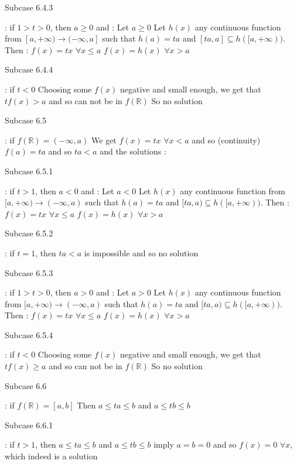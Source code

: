 \begin{solution}
\begin{bolded}Subcase 6.4.3\end{bolded} : if $1>t>0$, then $a\ge 0$ and :
Let $a\ge 0$ 
Let $h(x)$ any continuous function from $[a,+\infty)\to(-\infty,a]$ such that $h(a)=ta$ and $[ta,a]\subseteq h([a,+\infty))$. Then :
$f(x)=tx$ $\forall x\le a$
$f(x)=h(x)$ $\forall x>a$

\begin{bolded}Subcase 6.4.4\end{bolded} : if $t<0$
Choosing some $f(x)$ negative and small enough, we get that $tf(x)> a$ and so can not be in $f(\mathbb R)$
So no solution

\begin{bolded}Subcase 6.5\end{bolded} : if $f(\mathbb R)=(-\infty,a)$
We get $f(x)=tx$ $\forall x<a$ and so (continuity) $f(a)=ta$ and so $ta<a$ and the solutions :

\begin{bolded}Subcase 6.5.1\end{bolded}: if $t>1$, then $a< 0$ and :
Let $a<0$ 
Let $h(x)$ any continuous function from $[a,+\infty)\to(-\infty,a)$ such that $h(a)=ta$ and $[ta,a)\subseteq h([a,+\infty))$. Then :
$f(x)=tx$ $\forall x\le a$
$f(x)=h(x)$ $\forall x>a$

\begin{bolded}Subcase 6.5.2\end{bolded}: if $t=1$, then $ta<a$ is impossible and so no solution

\begin{bolded}Subcase 6.5.3\end{bolded} : if $1>t>0$, then $a>0$ and :
Let $a>0$ 
Let $h(x)$ any continuous function from $[a,+\infty)\to(-\infty,a)$ such that $h(a)=ta$ and $[ta,a)\subseteq h([a,+\infty))$. Then :
$f(x)=tx$ $\forall x\le a$
$f(x)=h(x)$ $\forall x>a$

\begin{bolded}Subcase 6.5.4\end{bolded} : if $t<0$
Choosing some $f(x)$ negative and small enough, we get that $tf(x)\ge a$ and so can not be in $f(\mathbb R)$
So no solution

\begin{bolded}Subcase 6.6 \end{bolded}: if $f(\mathbb R)=[a,b]$
Then $a\le ta\le b$ and $a\le tb\le b$

\begin{bolded}Subcase 6.6.1\end{bolded} : if $t>1$, then $a\le ta\le b$ and $a\le tb\le b$ imply $a=b=0$ and so $f(x)=0$ $\forall x$, which indeed is a solution


\end{solution}

